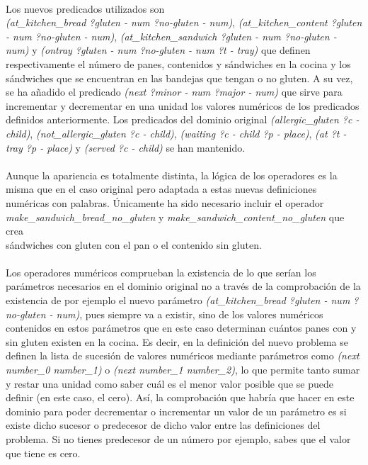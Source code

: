 \documentclass{article}
\begin{document}
\paragraph{}
Los nuevos predicados utilizados son \\ \textit{(at\_kitchen\_bread ?gluten - num ?no-gluten - num)},  \textit{(at\_kitchen\_content ?gluten - num ?no-gluten - num)}, \textit{(at\_kitchen\_sandwich ?gluten - num ?no-gluten - num)} y \textit{(ontray ?gluten - num ?no-gluten - num ?t - tray)} que definen respectivamente el número de panes, contenidos y sándwiches en la cocina y los sándwiches que se encuentran en las bandejas que tengan o no gluten. A su vez, se ha añadido el predicado \textit{(next ?minor - num ?major - num)} que sirve para incrementar y decrementar en una unidad los valores numéricos de los predicados definidos anteriormente. Los predicados del dominio original \textit{(allergic\_gluten ?c - child)}, \textit{(not\_allergic\_gluten ?c - child)}, \textit{(waiting ?c - child ?p - place)}, \textit{(at ?t - tray ?p - place)} y \textit{(served ?c - child)} se han mantenido.

\paragraph{}
Aunque la apariencia es totalmente distinta, la lógica de los operadores es la misma que en el caso original pero adaptada a estas nuevas definiciones numéricas con palabras. Únicamente ha sido necesario incluir el operador \textit{make\_sandwich\_bread\_no\_gluten} y \textit{make\_sandwich\_content\_no\_gluten} que crea \\ sándwiches con gluten con el pan o el contenido sin gluten.

\paragraph{}
Los operadores numéricos comprueban la existencia de lo que serían los \\ parámetros necesarios en el dominio original no a través de la comprobación de la existencia de por ejemplo el nuevo parámetro \textit{(at\_kitchen\_bread ?gluten - num ?no-gluten - num)}, pues siempre va a existir, sino de los valores numéricos contenidos en estos parámetros que en este caso determinan cuántos panes con y sin gluten existen en la cocina. Es decir, en la definición del nuevo problema se definen la lista de sucesión de valores numéricos mediante parámetros como \textit{(next number\_0 number\_1)} o \textit{(next number\_1 number\_2)}, lo que permite tanto sumar y restar una unidad como saber cuál es el menor valor posible que se puede definir (en este caso, el cero). Así, la comprobación que habría que hacer en este dominio para poder decrementar o incrementar un valor de un parámetro es si existe dicho sucesor o predecesor de dicho valor entre las definiciones del problema. Si no tienes predecesor de un número por ejemplo, sabes que el valor que tiene es cero.
\end{document}
